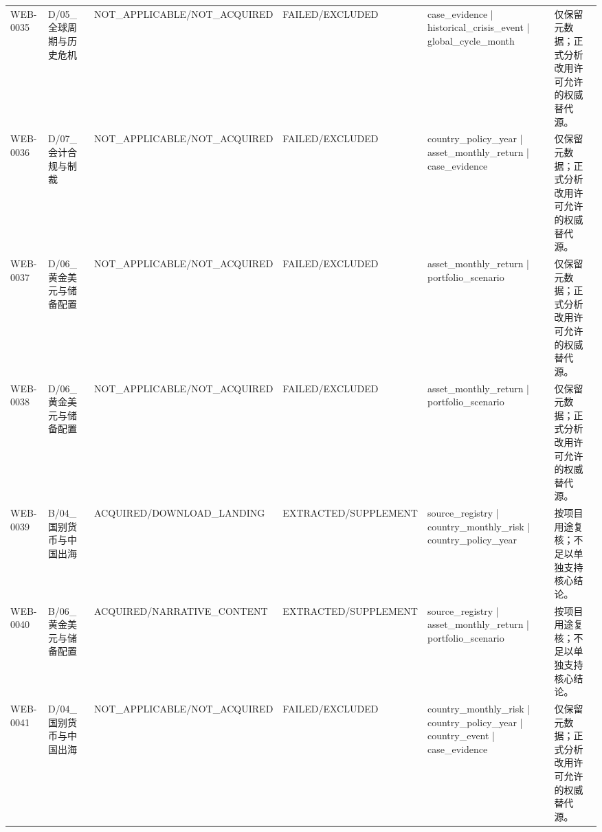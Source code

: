 \begin{landscape}
\begin{longtable}{p{1.8cm}p{2.6cm}p{2.6cm}p{2.6cm}p{4.8cm}p{7.2cm}}
WEB-0035 & D/\allowbreak{}05\_\allowbreak{}全球周期与历史危机 & NOT\_\allowbreak{}APPLICABLE/\allowbreak{}NOT\_\allowbreak{}ACQUIRED & FAILED/\allowbreak{}EXCLUDED & case\_\allowbreak{}evidence | historical\_\allowbreak{}crisis\_\allowbreak{}event | global\_\allowbreak{}cycle\_\allowbreak{}month & 仅保留元数据；正式分析改用许可允许的权威替代源。\\
WEB-0036 & D/\allowbreak{}07\_\allowbreak{}会计合规与制裁 & NOT\_\allowbreak{}APPLICABLE/\allowbreak{}NOT\_\allowbreak{}ACQUIRED & FAILED/\allowbreak{}EXCLUDED & country\_\allowbreak{}policy\_\allowbreak{}year | asset\_\allowbreak{}monthly\_\allowbreak{}return | case\_\allowbreak{}evidence & 仅保留元数据；正式分析改用许可允许的权威替代源。\\
WEB-0037 & D/\allowbreak{}06\_\allowbreak{}黄金美元与储备配置 & NOT\_\allowbreak{}APPLICABLE/\allowbreak{}NOT\_\allowbreak{}ACQUIRED & FAILED/\allowbreak{}EXCLUDED & asset\_\allowbreak{}monthly\_\allowbreak{}return | portfolio\_\allowbreak{}scenario & 仅保留元数据；正式分析改用许可允许的权威替代源。\\
WEB-0038 & D/\allowbreak{}06\_\allowbreak{}黄金美元与储备配置 & NOT\_\allowbreak{}APPLICABLE/\allowbreak{}NOT\_\allowbreak{}ACQUIRED & FAILED/\allowbreak{}EXCLUDED & asset\_\allowbreak{}monthly\_\allowbreak{}return | portfolio\_\allowbreak{}scenario & 仅保留元数据；正式分析改用许可允许的权威替代源。\\
WEB-0039 & B/\allowbreak{}04\_\allowbreak{}国别货币与中国出海 & ACQUIRED/\allowbreak{}DOWNLOAD\_\allowbreak{}LANDING & EXTRACTED/\allowbreak{}SUPPLEMENT & source\_\allowbreak{}registry | country\_\allowbreak{}monthly\_\allowbreak{}risk | country\_\allowbreak{}policy\_\allowbreak{}year & 按项目用途复核；不足以单独支持核心结论。\\
WEB-0040 & B/\allowbreak{}06\_\allowbreak{}黄金美元与储备配置 & ACQUIRED/\allowbreak{}NARRATIVE\_\allowbreak{}CONTENT & EXTRACTED/\allowbreak{}SUPPLEMENT & source\_\allowbreak{}registry | asset\_\allowbreak{}monthly\_\allowbreak{}return | portfolio\_\allowbreak{}scenario & 按项目用途复核；不足以单独支持核心结论。\\
WEB-0041 & D/\allowbreak{}04\_\allowbreak{}国别货币与中国出海 & NOT\_\allowbreak{}APPLICABLE/\allowbreak{}NOT\_\allowbreak{}ACQUIRED & FAILED/\allowbreak{}EXCLUDED & country\_\allowbreak{}monthly\_\allowbreak{}risk | country\_\allowbreak{}policy\_\allowbreak{}year | country\_\allowbreak{}event | case\_\allowbreak{}evidence & 仅保留元数据；正式分析改用许可允许的权威替代源。\\

\end{longtable}
\end{landscape}

